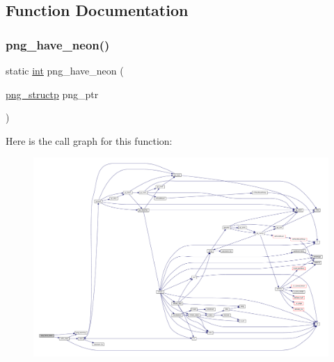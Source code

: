 \subsection{Function Documentation}
\mbox{\label{linux-auxv_8c_a07e715fb224e41ff1a5ccbeebdb16369}} 
\subsubsection{\texorpdfstring{png\+\_\+have\+\_\+neon()}{png\_have\_neon()}}
{\footnotesize\ttfamily static \mbox{\hyperlink{ioapi_8h_a787fa3cf048117ba7123753c1e74fcd6}{int}} png\+\_\+have\+\_\+neon (\begin{DoxyParamCaption}\item[{\mbox{\hyperlink{png_8h_a05b958915368d6bbd797ef70f24b9ff6}{png\+\_\+structp}}}]{png\+\_\+ptr }\end{DoxyParamCaption})\hspace{0.3cm}{\ttfamily [static]}}

Here is the call graph for this function\+:
\nopagebreak
\begin{figure}[H]
\begin{center}
\leavevmode
\includegraphics[width=350pt]{linux-auxv_8c_a07e715fb224e41ff1a5ccbeebdb16369_cgraph}
\end{center}
\end{figure}
\mbox{\label{linux-auxv_8c_a23ad580f6c3e8b4e8afd2c07d37913d2}} 
